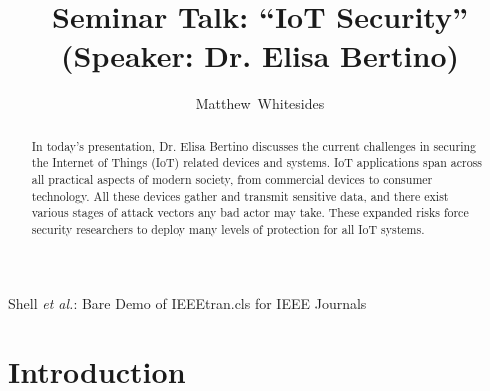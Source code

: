 \documentclass[journal,onecolumn]{IEEEtran}
\begin{document}
%
\title{Seminar Talk: ``IoT Security''\\ (Speaker: Dr. Elisa Bertino)}

%
%
%
\author{Matthew~Whitesides}%

%
{Shell \MakeLowercase{\textit{et al.}}: Bare Demo of IEEEtran.cls for IEEE Journals}

\maketitle 

\begin{abstract}
  In today's presentation, Dr. Elisa Bertino discusses the current challenges in securing the Internet of Things (IoT) related devices and systems. IoT applications span across all practical aspects of modern society, from commercial devices to consumer technology. All these devices gather and transmit sensitive data, and there exist various stages of attack vectors any bad actor may take. These expanded risks force security researchers to deploy many levels of protection for all IoT systems. 
\end{abstract}


\IEEEpeerreviewmaketitle

\section{Introduction}
\end{document}
